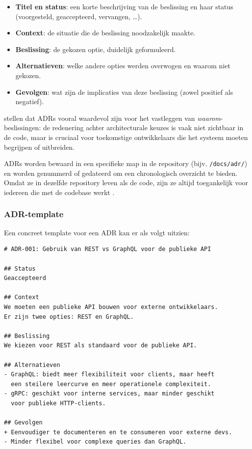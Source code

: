 \begin{itemize}
    \item \textbf{Titel en status}: een korte beschrijving van de beslissing en haar status (voorgesteld, geaccepteerd, vervangen, \ldots).
    \item \textbf{Context}: de situatie die de beslissing noodzakelijk maakte.
    \item \textbf{Beslissing}: de gekozen optie, duidelijk geformuleerd.
    \item \textbf{Alternatieven}: welke andere opties werden overwogen en waarom niet gekozen.
    \item \textbf{Gevolgen}: wat zijn de implicaties van deze beslissing (zowel positief als negatief).
\end{itemize}

\textcite{bhatti2021docsdevelopers} stellen dat ADRs vooral waardevol zijn voor het vastleggen van \textit{waarom}-beslissingen: de redenering achter architecturale keuzes is vaak niet zichtbaar in de code, maar is cruciaal voor toekomstige ontwikkelaars die het systeem moeten begrijpen of uitbreiden.

ADRs worden bewaard in een specifieke map in de repository (bijv. \texttt{/docs/adr/}) en worden genummerd of gedateerd om een chronologisch overzicht te bieden. Omdat ze in dezelfde repository leven als de code, zijn ze altijd toegankelijk voor iedereen die met de codebase werkt \autocite{gentle2017docslikecode}.

\subsubsection{ADR-template}
Een concreet template voor een ADR kan er als volgt uitzien:

\begin{verbatim}
# ADR-001: Gebruik van REST vs GraphQL voor de publieke API

## Status
Geaccepteerd

## Context
We moeten een publieke API bouwen voor externe ontwikkelaars.
Er zijn twee opties: REST en GraphQL.

## Beslissing
We kiezen voor REST als standaard voor de publieke API.

## Alternatieven
- GraphQL: biedt meer flexibiliteit voor clients, maar heeft
  een steilere leercurve en meer operationele complexiteit.
- gRPC: geschikt voor interne services, maar minder geschikt
  voor publieke HTTP-clients.

## Gevolgen
+ Eenvoudiger te documenteren en te consumeren voor externe devs.
- Minder flexibel voor complexe queries dan GraphQL.
\end{verbatim}

